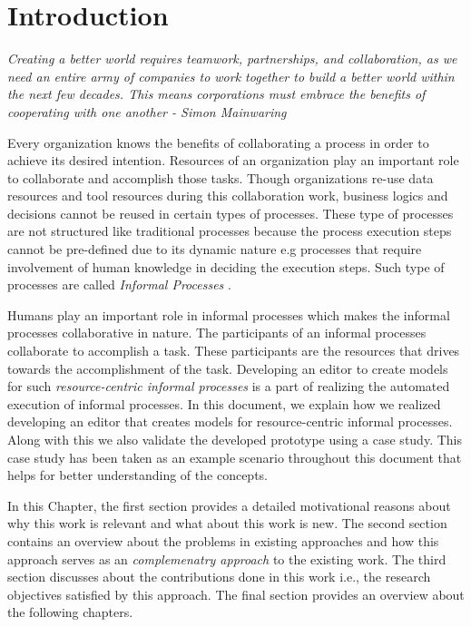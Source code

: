 \chapter{Introduction}
\label{chap:introduction}
\begin{center}
	\textit{Creating a better world requires teamwork, partnerships, and collaboration, as we need an entire army of companies to work together to build a better world within the next few decades. This means corporations must embrace the benefits of cooperating with one another -  Simon Mainwaring}
\end{center}

 Every organization knows the benefits of collaborating a process in order to achieve its desired intention. Resources of an organization play an important role to collaborate and accomplish those tasks. Though organizations re-use data resources and tool resources during this collaboration work, business logics and decisions cannot be reused in certain types of processes. These type of processes are not structured like traditional processes because the process execution steps cannot be pre-defined due to its dynamic nature e.g processes that require involvement of human knowledge in deciding the execution steps. Such type of processes are called \textit{Informal Processes} \cite{Sungur2014}.

Humans play an important role in informal processes which makes the informal processes collaborative in nature. The participants of an informal processes collaborate to accomplish a task. These participants are the resources that drives towards the accomplishment of the task.  Developing an editor to create models for such \textit{resource-centric informal processes} is a part of realizing the automated execution of informal processes. In this document, we explain how we realized developing an editor that creates models for resource-centric informal processes. Along with this we also validate the developed prototype using a case study. This case study has been taken as an example scenario throughout this document that helps for better understanding of the concepts.

In this Chapter, the first section provides a detailed motivational reasons about why this work is relevant and what about this work is new.  The second section contains an overview about the problems in existing approaches and how this approach serves as an \textit{complemenatry approach} to the existing work. The third section discusses about the contributions done in this work i.e., the research objectives satisfied by this approach. The final section provides an overview about the following chapters. 


